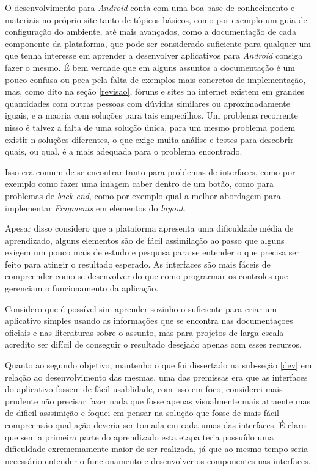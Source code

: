 \documentclass[hidelinks,12pt]{article}
\begin{document}
O desenvolvimento para \textit{Android} conta com uma boa base de conhecimento e materiais no pr\'oprio site tanto de t\'opicos b\'asicos, como por exemplo um guia de configura\c{c}\~ao do ambiente, at\'e mais avan\c{c}ados, como a documenta\c{c}\~ao de cada componente da plataforma, que pode ser considerado suficiente para qualquer um que tenha interesse em aprender a desenvolver aplicativos para \textit{Android} consiga fazer o mesmo. É bem verdade que em alguns assuntos a documenta\c{c}\~ao \'e um pouco confusa ou peca pela falta de exemplos mais concretos de implementa\c{c}\~ao, mas, como dito na se\c{c}\~ao \ref{revisao}, f\'oruns e sites na internet existem em grandes quantidades com outras pessoas com dúvidas similares ou aproximadamente iguais, e a maoria com solu\c{c}\~oes para tais empecilhos. Um problema recorrente nisso \'e talvez a falta de uma solu\c{c}\~ao única, para um mesmo problema podem existir n solu\c{c}\~oes diferentes, o que exige muita an\'alise e testes para descobrir quais, ou qual, \'e a mais adequada para o problema encontrado.

Isso era comum de se encontrar tanto para problemas de interfaces, como por exemplo como fazer uma imagem caber dentro de um bot\~ao, como para problemas de \textit{back-end}, como por exemplo qual a melhor abordagem para implementar \textit{Fragments} em elementos do \textit{layout}.

Apesar disso considero que a plataforma apresenta uma dificuldade m\'edia de aprendizado, alguns elementos s\~ao de f\'acil assimila\c{c}\~ao ao passo que alguns exigem um pouco mais de estudo e pesquisa para se entender o que precisa ser feito para atingir o resultado esperado. As interfaces s\~ao mais f\'aceis de compreender como se desenvolver do que como prograrmar os controles que gerenciam o funcionamento da aplica\c{c}\~ao.

Considero que \'e poss\'ivel sim aprender sozinho o suficiente para criar um aplicativo simples usando as informa\c{c}\~oes que se encontra nas documenta\c{c}oes oficiais e nas literaturas sobre o assunto, mas para projetos de larga escala acredito ser dif\'icil de conseguir o resultado desejado apenas com esses recursos.

Quanto ao segundo objetivo, mantenho o que foi dissertado na sub-se\c{c}\~ao \ref{dev} em rela\c{c}\~ao ao desenvolvimento das mesmas, uma das premissas era que as interfaces do aplicativo fossem de f\'acil usablidade, com isso em foco, considerei mais prudente n\~ao precisar fazer nada que fosse apenas visualmente mais atraente mas de d\'ificil asssimi\c{c}\~ao e foquei em pensar na solu\c{c}\~ao que fosse de mais f\'acil compreens\~ao qual a\c{c}\~ao deveria ser tomada em cada umas das interfaces. É claro que sem a primeira parte do aprendizado esta etapa teria possu\'ido uma dificuldade exrememamente maior de ser realizada, j\'a que ao mesmo tempo seria necess\'ario entender o funcionamento e desenvolver os componentes nas interfaces.
\end{document}
